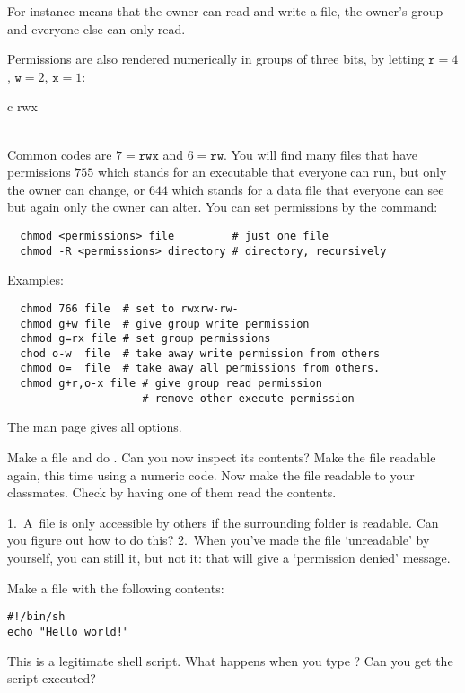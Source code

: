 For instance
 means that the owner can read and write a file, the owner's
group and everyone else can only read. 

Permissions are also rendered
numerically in groups of three bits, by letting
$\mathtt{r}=4$, $\mathtt{w}=2$, $\mathtt{x}=1$:

\begin{fntable}{c}
 rwx\\  \\ 
\end{fntable}

Common codes are $7=\mathtt{rwx}$ and $6=\mathtt{rw}$. You will find
many files that have permissions $755$ which stands for an executable
that everyone can run, but only the owner can change, or $644$ which
stands for a data file that everyone can see but again only the owner
can alter. You can set permissions by the  command:
\begin{verbatim}
  chmod <permissions> file         # just one file
  chmod -R <permissions> directory # directory, recursively
\end{verbatim}
Examples:
\begin{verbatim}
  chmod 766 file  # set to rwxrw-rw-
  chmod g+w file  # give group write permission
  chmod g=rx file # set group permissions
  chod o-w  file  # take away write permission from others
  chmod o=  file  # take away all permissions from others.
  chmod g+r,o-x file # give group read permission
                     # remove other execute permission
\end{verbatim}
The man page gives all options.

\begin{exercise}
  Make a file  and do . Can you now inspect
  its contents? Make the file readable again, this time using a
  numeric code. Now make the file readable to your classmates. Check
  by having one of them read the contents.
\end{exercise}
\begin{outcome}
  1.~A~file is only accessible by others if the surrounding folder is
  readable. Can you figure out how to do this? 2.~When you've made the
  file `unreadable' by yourself, you can still  it, but not
   it: that will give a `permission denied' message.
\end{outcome}

Make a file  with the following contents:
\begin{verbatim}
#!/bin/sh
echo "Hello world!"
\end{verbatim}
This is a legitimate shell script. What happens when you type
? Can you get the script executed?


